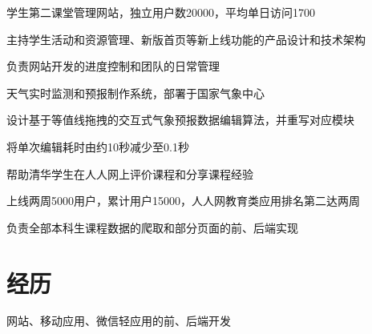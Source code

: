 \documentclass[a4paper]{rukh-cv-zh}
\begin{document}
\begin{minipage}[t]{0.74\textwidth}
\sectionspace


\begin{tightitemize}
\item 学生第二课堂管理网站，独立用户数20000，平均单日访问1700
\item 主持学生活动和资源管理、新版首页等新上线功能的产品设计和技术架构
\item 负责网站开发的进度控制和团队的日常管理
\end{tightitemize}

\sectionspace


\begin{tightitemize}
\item 天气实时监测和预报制作系统，部署于国家气象中心
\item 设计基于等值线拖拽的交互式气象预报数据编辑算法，并重写对应模块
\item 将单次编辑耗时由约10秒减少至0.1秒
\end{tightitemize}

\sectionspace


\begin{tightitemize}
\item 帮助清华学生在人人网上评价课程和分享课程经验
\item 上线两周5000用户，累计用户15000，人人网教育类应用排名第二达两周
\item 负责全部本科生课程数据的爬取和部分页面的前、后端实现
\end{tightitemize}

\sectionspace


\section{经历}

\begin{tightitemize}
\item 网站、移动应用、微信轻应用的前、后端开发
\end{tightitemize}


\end{minipage}
\end{document}
